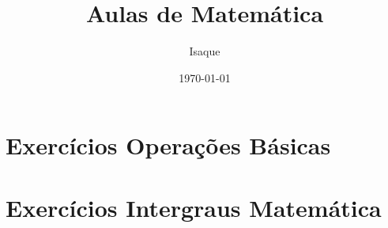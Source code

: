 \documentclass[12pt,a4paper]{book}
\begin{document}
	
	\title{Aulas de Matemática}
	\author{Isaque}
	\date{\today}
	\maketitle
	
	\tableofcontents
	
	\chapter{Exercícios Operações Básicas}
	
	
	
		
	\chapter{Exercícios Intergraus Matemática }
	
	
	
	
\end{document}
